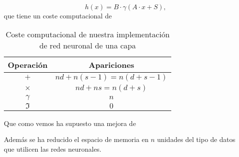 \begin{equation}
    h(x) =  B \cdot
        \gamma \left( 
            A
            \cdot 
            x
            + S
        \right),
\end{equation}
que tiene un coste computacional de 
\begin{table}[h]
    \begin{center}
    \begin{tabular}{| c | c |}
    \hline
    Operación & Apariciones  \\ \hline
    $+$ & $n d+n(s-1) = n(d+s-1)$  \\
    $\times$ & $n d+n s = n(d+s)$  \\
    $\gamma$ & $n$  \\
    $\mathfrak{I}$ & $0$  \\
    \hline
    \end{tabular}
    \caption{Coste computacional de nuestra implementación de red neuronal de una capa}
    \label{tab:coste computacional nuestr modelo red neuronal}
    \end{center}
\end{table}

Que como vemos ha supuesto una mejora de 

\begin{table}[h]
    \centering
    \caption{Comparativas de coste computacional entre la implementación usual de una red neuronal y la nuestra}
    \label{tab:comparativas coste red neuronal }
\end{table}

Además se ha reducido el espacio de memoria en $n$ unidades del tipo de datos que utilicen las redes neuronales. 


